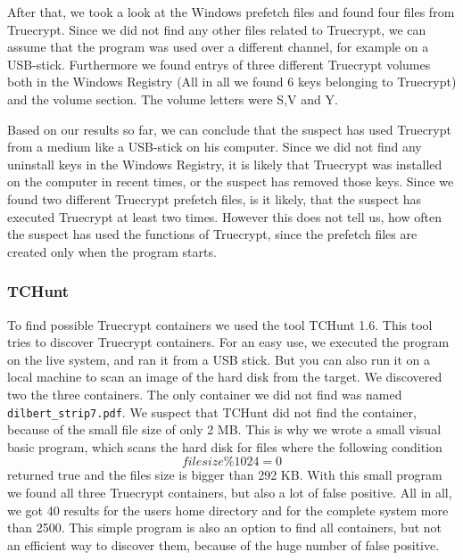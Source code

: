 After that, we took a look at the Windows prefetch files and found four files from Truecrypt. 
Since we did not find any other files related to Truecrypt, we can assume that the program was used over a different channel, for example on a USB-stick. 
Furthermore we found entrys of three different Truecrypt volumes both in the  Windows Registry (All in all we found 6 keys belonging to Truecrypt) and the volume section. 
The volume letters were S,V and Y.

Based on our results so far, we can conclude that the suspect has used Truecrypt from a medium like a USB-stick on his computer. 
Since we did not find any uninstall keys in the  Windows Registry, it is likely that Truecrypt was installed on the computer in recent times, or the suspect has removed those keys. 
Since we found two different Truecrypt prefetch files, is it likely, that the suspect has executed Truecrypt at least two times. 
However this does not tell us, how often the suspect has used the functions of Truecrypt, since the prefetch files are created only when the program starts.

\subsubsection{TCHunt}
To find possible Truecrypt containers we used the tool TCHunt 1.6. 
This tool tries to discover Truecrypt containers. 
For an easy use, we executed the program on the live system, and ran it from a USB stick. 
But you can also run it on a local machine to scan an image of the hard disk from the target. 
We discovered two the three containers. 
The only container we did not find was named \texttt{dilbert\_strip7.pdf}. 
We suspect that TCHunt did not find the container, because of the small file size of only 2 MB. 
This is why we wrote a small visual basic program, which scans the hard disk for files where the following condition  \[filesize \% 1024 = 0\] returned true and the files size is bigger than 292 KB. 
With this small program we found all three Truecrypt containers, but also a lot of false positive. 
All in all, we got 40 results for the users home directory and for the complete system more than 2500. 
This simple program is also an option to find all containers, but not an efficient way to discover them, because of the huge number of false positive.  

